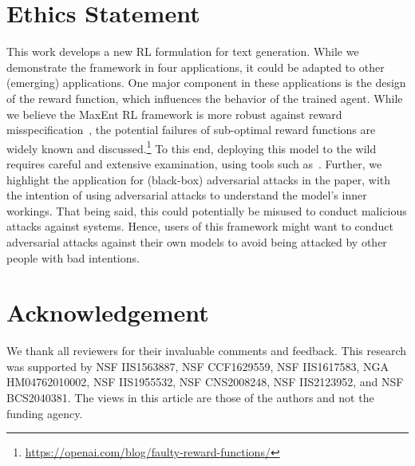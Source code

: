 \documentclass[11pt]{article}
\begin{document}
\section*{Ethics Statement}
This work develops a new RL formulation for text generation. While we demonstrate the framework in four applications, it could be adapted to other (emerging) applications. One major component in these applications is the design of the reward function, which influences the behavior of the trained agent. While we believe the MaxEnt RL framework is more robust against reward misspecification~\citep{eysenbach2021maximum}, the potential failures of sub-optimal reward functions are widely known and discussed.\footnote{\url{https://openai.com/blog/faulty-reward-functions/}} To this end, deploying this model to the wild requires careful and extensive examination, using tools such as~\citet{ribeiro2020beyond}. Further, we highlight the application for (black-box) adversarial attacks in the paper, with the intention of using adversarial attacks to understand the model's inner workings. That being said, this could potentially be misused to conduct malicious attacks against systems. Hence, users of this framework might want to conduct adversarial attacks against their own models to avoid being attacked by other people with bad intentions.

\section*{Acknowledgement}
We thank all reviewers for their invaluable comments and feedback. This research was supported by NSF IIS1563887, NSF CCF1629559, NSF IIS1617583, NGA HM04762010002, NSF IIS1955532, NSF CNS2008248, NSF IIS2123952, and NSF BCS2040381. The views in this article are those of the authors and not the funding agency.







































\clearpage

\appendix
\setcounter{table}{0}
\setcounter{figure}{0}
\setcounter{algorithm}{0}
\renewcommand{\thetable}{A.\arabic{table}}
\renewcommand{\thefigure}{A.\arabic{figure}}
\renewcommand{\thealgorithm}{A.\arabic{algorithm}} 

\end{document}
